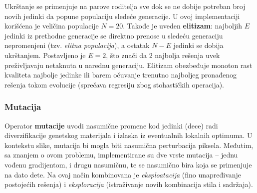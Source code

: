\documentclass[a4paper,12pt]{article}
\begin{document}
Ukrštanje se primenjuje na parove roditelja sve dok se ne dobije potreban broj novih jedinki da popune populaciju sledeće generacije. U ovoj implementaciji korišćena je veličina populacije $N=20$. Takođe je uveden \textbf{elitizam}: najboljih $E$ jedinki iz prethodne generacije se direktno prenose u sledeću generaciju nepromenjeni (tzv. \emph{elitna populacija}), a ostatak $N-E$ jedinki se dobija ukrštanjem. Postavljeno je  $E=2$, što znači da 2 najbolja rešenja uvek preživljavaju netaknuta u narednu generaciju. Elitizam obezbeđuje monoton rast kvaliteta najbolje jedinke ili barem očuvanje trenutno najboljeg pronađenog rešenja tokom evolucije (sprečava regresiju zbog stohastičkih operacija).

\subsubsection{Mutacija}
Operator \textbf{mutacije} uvodi nasumične promene kod jedinki (dece) radi diverzifikacije genetskog materijala i izlaska iz eventualnih lokalnih optimuma. U kontekstu slike, mutacija bi mogla biti nasumična perturbacija piksela. Međutim, sa znanjem o ovom problemu, implementirane su dve vrste mutacija -- jednu vođenu gradijentom, i drugu nasumičnu, te se nasumično bira koja se primenjuje na dato dete. Na ovaj način kombinovana je \emph{eksploatacija} (fino unapređivanje postojećih rešenja) i \emph{eksploracija} (istraživanje novih kombinacija stila i sadržaja).
\end{document}
